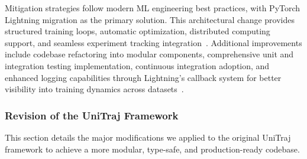 Mitigation strategies follow modern ML engineering best practices, with PyTorch Lightning migration as the primary solution. This architectural change provides structured training loops, automatic optimization, distributed computing support, and seamless experiment tracking integration~\cite{falcon2019pytorch}. Additional improvements include codebase refactoring into modular components, comprehensive unit and integration testing implementation, continuous integration adoption, and enhanced logging capabilities through Lightning's callback system for better visibility into training dynamics across datasets~\cite{unitrajFeng2024, scenarionetLi2023}.


\subsubsection{Revision of the UniTraj Framework}
This section details the major modifications we applied to the original UniTraj framework to achieve a more modular, type-safe, and production-ready codebase.

